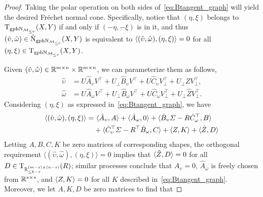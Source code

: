 \begin{proof}
    Taking the polar operation on both sides of~\eqref{eq:Btangent_graph} will yield the desired Fr\'echet normal cone. Specifically, notice that $(\eta,\xi)$ belongs to $\mathrm{T}_{\mathrm{gph}\mathrm{N}_{\mathcal{M}_{\le r}}}(X,Y)$ if and only if $(-\eta,-\xi)$ is in it, and thus $(\hat{\upsilon},\hat{\omega})\in\hat{\mathrm{N}}_{\mathrm{gph}\mathrm{N}_{\mathcal{M}_{\le r}}}(X,Y)$ is equivalent to $\langle {(\hat{\upsilon},\hat{\omega}),(\eta,\xi)} \rangle=0$ for all $(\eta,\xi)\in\mathrm{T}_{\mathrm{gph}\mathrm{N}_{\mathcal{M}_{\le r}}}(X,Y)$. 

    Given $(\hat{\upsilon},\hat{\omega})\in\mathbb{R}^{m\times n}\times\mathbb{R}^{m\times n}$, we can parameterize them as follows,
    \begin{equation}\label{eq:hatupsilon_hatomega}
        \begin{aligned}
            \hat\upsilon &=  U\hat{A}_{\upsilon}V^\top + U_\bot \hat{B}_\upsilon V^\top + U\hat{C}_\upsilon V_\bot^\top + U_\bot Z V_\bot^\top,
           \\
           \hat\omega &= U\hat{A}_{\omega}V^\top + U_\bot \hat{B}_\omega V^\top + U\hat{C}_\omega V_\bot^\top + U_\bot \hat{Z} V_\bot^\top.
        \end{aligned}
    \end{equation}
    Considering $(\eta,\xi)$ as expressed in~\eqref{eq:Btangent_graph}, we have
    \begin{equation}\label{eq:innerto0}
        \begin{aligned}
        \innerp{(\hat{\upsilon},\hat{\omega}),(\eta,\xi)} = &\ \innerp{\hat{A}_\upsilon,A} + \innerp{\hat{A}_\omega,0}+\innerp{\hat{B}_\upsilon\varSigma-R\hat{C}_\omega^\top,B} 
        \\
        &+ \innerp{\hat{C}_\upsilon^\top\varSigma-R^\top\hat{B}_\omega,C} + \innerp{Z,K} + \innerp{\hat{Z},D}            
        \end{aligned}
    \end{equation}
    Letting $A,B,C,K$ be zero matrices of corresponding shapes, the orthogonal requirement $\langle(\hat{\upsilon},\hat{\omega}),(\eta,\xi)\rangle=0$ implies that $\langle {\hat{Z},D} \rangle=0$ for all $D\in\mathrm{T}_{\mathbb{R}^{(m-s)\times(n-s)}_{\le k-r}}(R)$; similar processes conclude that $\hat{A}_\upsilon=0$, $\hat{A}_\omega$ is freely chosen from $\mathbb{R}^{s\times s}$, and $\langle {Z,K} \rangle=0$ for all $K$ described in~\eqref{eq:Btangent_graph}. Moreover, we let $A,K,D$ be zero matrices to find that

\end{proof}
